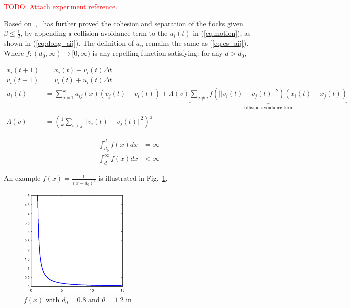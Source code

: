 \textcolor{red}{TODO: Attach experiment reference.}

Based on~\cite{CuckerSmale2007},~\cite{CuckerDong2010} has further proved the cohesion and separation of the flocks given $\beta\leq\frac{1}{2}$, by appending a collision avoidance term to the $u_i(t)$ in (\ref{eq:motion}), as shown in (\ref{eq:dong_aij}). The definition of $a_{ij}$ remains the same as (\ref{eq:cs_aij}). Where $f:(d_0,\infty)\to[0,\infty)$ is any repelling function satisfying: for any $d>d_0$,

\begin{equation}\label{eq:dong_aij}
\begin{aligned}
x_i(t+1)&=x_i(t)+v_i(t)\Delta t\\
v_i(t+1)&=v_i(t)+u_i(t)\Delta t\\
u_i(t)&=\sum^k_{j=1}a_{ij}(x)(v_j(t)-v_i(t))+\Lambda(v)\underbrace{\sum_{j\neq i}f(||v_i(t)-v_j(t)||^2)(x_i(t)-x_j(t))}_{\text{collision-avoidance term}}\\
\Lambda(v)&=(\frac{1}{k}\sum_{i>j}||v_i(t)-v_j(t)||^2)^{\frac{1}{2}}
\end{aligned}
\end{equation}

\begin{equation}\label{eq:dong_f}
\begin{aligned}
\int_{d_0}^d f(x)dx&=\infty\\
\int_d^{\infty} f(x)dx&<\infty
\end{aligned}
\end{equation}

An example $f(x)=\frac{1}{(x-d_0)^{\theta}}$ is illustrated in Fig.~\ref{fig:dong_f}.

\begin{figure}[htb]
  \centering
  \includegraphics[width=0.48\textwidth]{figure/dong_f.eps}
  \caption{$f(x)$ with $d_0=0.8$ and $\theta=1.2$ in ~\cite{CuckerDong2010}}
  \label{fig:dong_f}
\end{figure}

